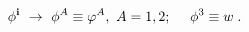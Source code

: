 \begin{equation}\label{7'}
   \phi^{\bf{i}} \ \rightarrow \ \phi^A \equiv \varphi^A,\ A=1,2; \quad \ \phi^3 \equiv w\;.
\end{equation}

